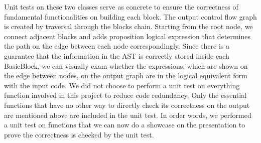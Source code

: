 \documentclass[11pt]{article}
\begin{document}
Unit tests on these two classes serve as concrete to ensure the correctness of fundamental functionalities on building each block. The output control flow graph is created by traversal through the blocks chain. Starting from the root node, we connect adjacent blocks and adds proposition logical expression that determines the path on the edge between each node correspondingly. Since there is a guarantee that the information in the AST is correctly stored inside each BasicBlock, we can visually exam whether the expressions, which are shown on the edge between nodes, on the output graph are in the logical equivalent form with the input code. We did not choose to perform a unit test on everything function involved in this project to reduce code redundancy. Only the essential functions that have no other way to directly check its correctness on the output are mentioned above are included in the unit test. In order words, we performed a unit test on functions that we can now do a showcase on the presentation to prove the correctness is checked by the unit test.
\end{document}
